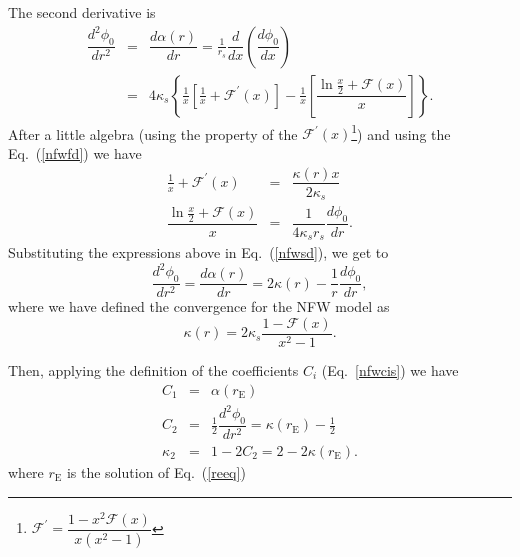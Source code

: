 \documentclass[a4paper,twoside,prd]{revtex4}
\def \ks {\kappa_s}
\def \rs {r_s}
\def \mf {\mathcal{F}}
\def \re {r_{\mathrm{E}}}
\def \po {\phi_0}
\def \al {\alpha}
\begin{document}
The second derivative is
\begin{eqnarray}
\dfrac{d^2\po}{dr^2}&=&\dfrac{d\al(r)}{dr}=\frac{1}{\rs}\dfrac{d}{dx}\left(\dfrac{d\po}{dx} \right) \nonumber \\
                    &=& 4\ks\left\{\frac{1}{x}\left[\frac{1}{x}+\mf^\prime(x)\right]%
                    -\frac{1}{x}\left[\dfrac{\ln\frac{x}{2}+\mf(x)}{x}\right]\right\}.
\label{nfwsd}
\end{eqnarray}
After a little algebra (using the property of the $\mf^\prime(x)$\footnote{$\mf^\prime=\dfrac{1-x^2\mf(x)}{x(x^2-1)} $}) and using the
Eq.~(\ref{nfwfd}) we have
\begin{eqnarray*}
\frac{1}{x}+\mf^\prime(x)&=& \dfrac{\kappa(r)x}{2\ks}\\
\dfrac{\ln\frac{x}{2}+\mf(x)}{x}&=&\dfrac{1}{4\ks\rs}\dfrac{d\po}{dr}.
\end{eqnarray*}
Substituting the expressions above in  Eq.~(\ref{nfwsd}), we get to 
\begin{equation}
\dfrac{d^2\po}{dr^2}=\dfrac{d\al(r)}{dr}=2\kappa(r)-\frac{1}{r}\dfrac{d\po}{dr},
\label{nfwsdb}
\end{equation}
where we have defined the convergence for the NFW model as
\begin{equation}
\kappa(r)=2\ks\dfrac{1-\mf(x)}{x^2-1}.
\label{nfwk}
\end{equation}

Then, applying the definition of the coefficients $C_i$ (Eq.~\ref{nfwcis}) we have
\begin{eqnarray}
C_1&=&\al(\re) \label{nfwc1} \\
C_2&=&\frac{1}{2}\dfrac{d^2\po}{dr^2}=\kappa(\re)-\frac{1}{2} \label{nfwc2} \\
\kappa_2&=& 1-2C_2=2-2\kappa(\re) \label{nfwk2}.
\end{eqnarray}
where $\re$ is the solution of Eq.~(\ref{reeq})
\end{document}
